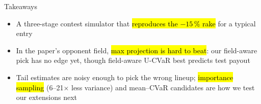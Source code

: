 \begin{frame}{Takeaways}
  \begin{itemize}
    \setlength\itemsep{0.8em}
    \item A three-stage contest simulator that \hl{reproduces the $-15\,\%$ rake} for a
      typical entry
    \item In the paper's opponent field, \hl{max projection is hard to beat}: our field-aware
      pick has no edge yet, though field-aware U-CVaR best predicts test payout
    \item Tail estimates are noisy enough to pick the wrong lineup; \hl{importance
      sampling} (6--21$\times$ less variance) and mean--CVaR candidates are how we
      test our extensions next
  \end{itemize}
  \vfill
  \vfill
\end{frame}



